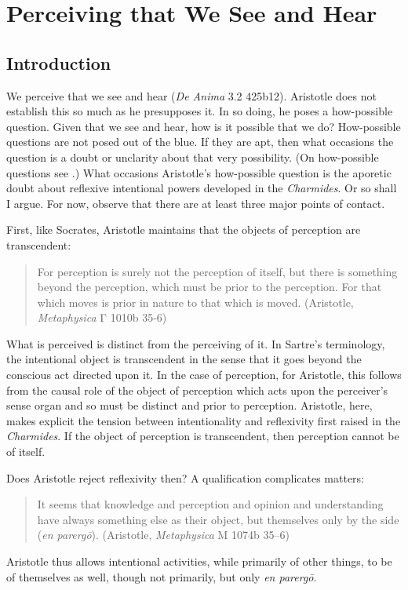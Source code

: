 \chapter{Perceiving that We See and Hear} %
\label{cha:perceiving}

\section{Introduction} %
\label{sec:introduction2}

We perceive that we see and hear (\emph{De Anima} 3.2 425b12). Aristotle does not establish this so much as he presupposes it. In so doing, he poses a how-possible question. Given that we see and hear, how is it possible that we do? How-possible questions are not posed out of the blue. If they are apt, then what occasions the question is a doubt or unclarity about that very possibility. (On how-possible questions see \citealt{Cassam:2007lq}.) What occasions Aristotle's how-possible question is the aporetic doubt about reflexive intentional powers developed in the \emph{Charmides}. Or so shall I argue. For now, observe that there are at least three major points of contact. 

First, like Socrates, Aristotle maintains that the objects of perception are transcendent:
\begin{quote}
	For perception is surely not the perception of itself, but there is something beyond the perception, which must be prior to the perception. For that which moves is prior in nature to that which is moved. (Aristotle, \emph{Metaphysica} {\sbl Γ} 1010b 35-6)
\end{quote}
What is perceived is distinct from the perceiving of it. In Sartre's terminology, the intentional object is transcendent in the sense that it goes beyond the conscious act directed upon it. In the case of perception, for Aristotle, this follows from the causal role of the object of perception which acts upon the perceiver's sense organ and so must be distinct and prior to perception. Aristotle, here, makes explicit the tension between intentionality and reflexivity first raised in the \emph{Charmides}. If the object of perception is transcendent, then perception cannot be of itself. 

Does Aristotle reject reflexivity then? A qualification complicates matters:
\begin{quote}
	It seems that knowledge and perception and opinion and understanding have always something else as their object, but themselves only by the side (\emph{en parergō}). (Aristotle, \emph{Metaphysica} {\sbl Μ} 1074b 35–6)
\end{quote}
Aristotle thus allows intentional activities, while primarily of other things, to be of themselves as well, though not primarily, but only \emph{en parergō}.

